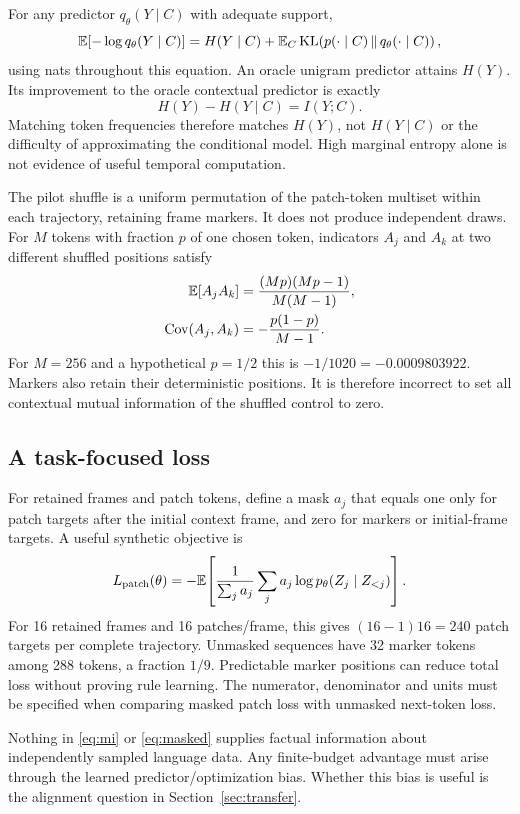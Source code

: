 For any predictor $q_\theta(Y\mid C)$ with adequate support,
\begin{equation}
 \mathbb{E}[-\log q_\theta(Y\mid C)]
 =H(Y\mid C)+
   \mathbb{E}_C\operatorname{KL}\!\left(p(\cdot\mid C)\,\|\,q_\theta(\cdot\mid C)\right),
 \label{eq:kl}
\end{equation}
using nats throughout this equation. An oracle unigram predictor attains
$H(Y)$. Its improvement to the oracle contextual predictor is exactly
\begin{equation}
 H(Y)-H(Y\mid C)=I(Y;C).
 \label{eq:mi}
\end{equation}
Matching token frequencies therefore matches $H(Y)$, not
$H(Y\mid C)$ or the difficulty of approximating the conditional model.
High marginal entropy alone is not evidence of useful temporal
computation.

The pilot shuffle is a uniform permutation of the patch-token multiset
within each trajectory, retaining frame markers. It does not produce
independent draws. For $M$ tokens with fraction $p$ of one chosen token,
indicators $A_j$ and $A_k$ at two different shuffled positions satisfy
\begin{align}
 \mathbb{E}[A_jA_k]&=\frac{(Mp)(Mp-1)}{M(M-1)},\\
 \operatorname{Cov}(A_j,A_k)&=-\frac{p(1-p)}{M-1}.
 \label{eq:shufflecov}
\end{align}
For $M=256$ and a hypothetical $p=1/2$ this is
$-1/1020=-0.0009803922$.
Markers also retain their deterministic positions. It is therefore
incorrect to set all contextual mutual information of the shuffled
control to zero.

\subsection{A task-focused loss}

For retained frames and patch tokens, define a mask $a_j$ that equals one
only for patch targets after the initial context frame, and zero for
markers or initial-frame targets. A useful synthetic objective is
\begin{equation}
 L_{\rm patch}(\theta)=
 -\mathbb{E}\!\left[\frac{1}{\sum_j a_j}
       \sum_j a_j\log p_\theta(Z_j\mid Z_{<j})\right].
 \label{eq:masked}
\end{equation}
For 16 retained frames and 16 patches/frame, this gives
$(16-1)16=240$ patch targets per complete trajectory.
Unmasked sequences have 32 marker tokens among 288 tokens, a fraction
$1/9$. Predictable marker positions can reduce total loss without proving
rule learning. The numerator, denominator and units must be specified
when comparing masked patch loss with unmasked next-token loss.

Nothing in \eqref{eq:mi} or \eqref{eq:masked} supplies factual information
about independently sampled language data. Any finite-budget advantage
must arise through the learned predictor/optimization bias. Whether this
bias is useful is the alignment question in Section~\ref{sec:transfer}.

